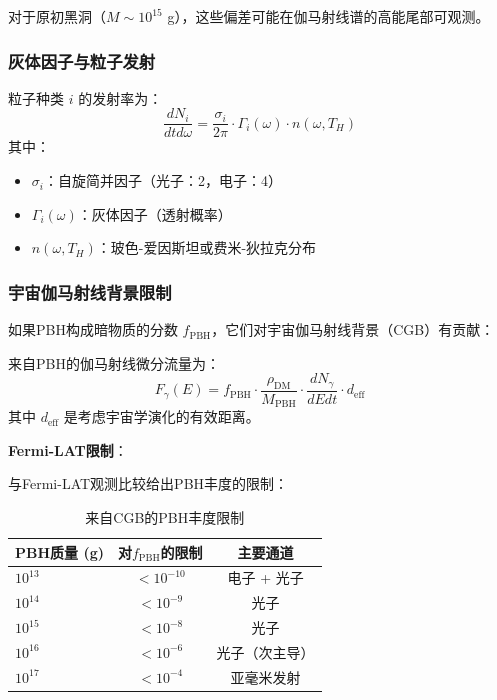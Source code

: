 对于原初黑洞（$M \sim 10^{15}$ g），这些偏差可能在伽马射线谱的高能尾部可观测。

\subsubsection{灰体因子与粒子发射}

粒子种类 $i$ 的发射率为：
\begin{equation}
    \frac{dN_i}{dt d\omega} = \frac{\sigma_{i}}{2\pi} \cdot \Gamma_i(\omega) \cdot n(\omega, T_H)
\end{equation}
其中：
\begin{itemize}
    \item $\sigma_i$：自旋简并因子（光子：2，电子：4）
    \item $\Gamma_i(\omega)$：灰体因子（透射概率）
    \item $n(\omega, T_H)$：玻色-爱因斯坦或费米-狄拉克分布
\end{itemize}

\subsubsection{宇宙伽马射线背景限制}

如果PBH构成暗物质的分数 $f_{\text{PBH}}$，它们对宇宙伽马射线背景（CGB）有贡献：

\begin{theorem}[PBH对CGB的贡献]
来自PBH的伽马射线微分流量为：
\begin{equation}
    F_\gamma(E) = f_{\text{PBH}} \cdot \frac{\rho_{\text{DM}}}{M_{\text{PBH}}} \cdot \frac{dN_\gamma}{dE dt} \cdot d_{\text{eff}}
\end{equation}
其中 $d_{\text{eff}}$ 是考虑宇宙学演化的有效距离。
\end{theorem}

\textbf{Fermi-LAT限制}：

与Fermi-LAT观测比较给出PBH丰度的限制：

\begin{table}[h]
\centering
\caption{来自CGB的PBH丰度限制}
\begin{tabular}{lcc}
\toprule
\textbf{PBH质量 (g)} & \textbf{对$f_{\text{PBH}}$的限制} & \textbf{主要通道} \\
\midrule
$10^{13}$ & $< 10^{-10}$ & 电子 + 光子 \\
$10^{14}$ & $< 10^{-9}$ & 光子 \\
$10^{15}$ & $< 10^{-8}$ & 光子 \\
$10^{16}$ & $< 10^{-6}$ & 光子（次主导） \\
$10^{17}$ & $< 10^{-4}$ & 亚毫米发射 \\
\bottomrule
\end{tabular}
\end{table}

